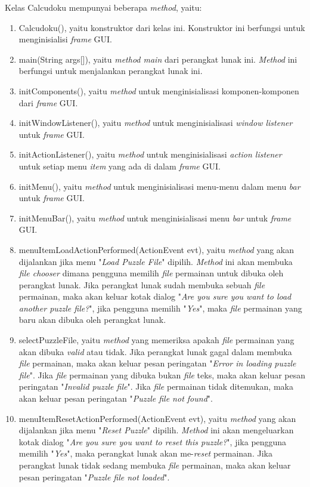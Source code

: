 Kelas Calcudoku mempunyai beberapa \textit{method}, yaitu:
\begin{enumerate}
\item Calcudoku(), yaitu konstruktor dari kelas ini. Konstruktor ini berfungsi untuk menginisialisi \textit{frame} GUI.
\item main(String args[]), yaitu \textit{method main} dari perangkat lunak ini. \textit{Method} ini berfungsi untuk menjalankan perangkat lunak ini.
\item initComponents(), yaitu \textit{method} untuk menginisialisasi komponen-komponen dari \textit{frame} GUI.
\item initWindowListener(), yaitu \textit{method} untuk menginisialisasi \textit{window listener} untuk \textit{frame} GUI.
\item initActionListener(), yaitu \textit{method} untuk menginisialisasi \textit{action listener} untuk setiap menu \textit{item} yang ada di dalam \textit{frame} GUI.
\item initMenu(), yaitu \textit{method} untuk menginisialisasi menu-menu dalam menu \textit{bar} untuk \textit{frame} GUI.
\item initMenuBar(), yaitu \textit{method} untuk menginisialisasi menu \textit{bar} untuk \textit{frame} GUI.
\item menuItemLoadActionPerformed(ActionEvent evt), yaitu \textit{method} yang akan dijalankan jika menu "\textit{Load Puzzle File}" dipilih. \textit{Method} ini akan membuka \textit{file chooser} dimana pengguna memilih \textit{file} permainan untuk dibuka oleh perangkat lunak. Jika perangkat lunak sudah membuka sebuah \textit{file} permainan, maka akan keluar kotak dialog "\textit{Are you sure you want to load another puzzle file?}", jika pengguna memilih "\textit{Yes}", maka \textit{file} permainan yang baru akan dibuka oleh perangkat lunak.
\item selectPuzzleFile, yaitu \textit{method} yang memeriksa apakah \textit{file} permainan yang akan dibuka \textit{valid} atau tidak. Jika perangkat lunak gagal dalam membuka \textit{file} permainan, maka akan keluar pesan peringatan "\textit{Error in loading puzzle file}". Jika \textit{file} permainan yang dibuka bukan \textit{file} teks, maka akan keluar pesan peringatan "\textit{Invalid puzzle file}". Jika \textit{file} permainan tidak ditemukan, maka akan keluar pesan peringatan "\textit{Puzzle file not found}".
\item menuItemResetActionPerformed(ActionEvent evt), yaitu \textit{method} yang akan dijalankan jika menu "\textit{Reset Puzzle}" dipilih. \textit{Method} ini akan mengeluarkan kotak dialog "\textit{Are you sure you want to reset this puzzle?}", jika pengguna memilih "\textit{Yes}", maka perangkat lunak akan me-\textit{reset} permainan. Jika perangkat lunak tidak sedang membuka \textit{file} permainan, maka akan keluar pesan peringatan "\textit{Puzzle file not loaded}".

\end{enumerate}

